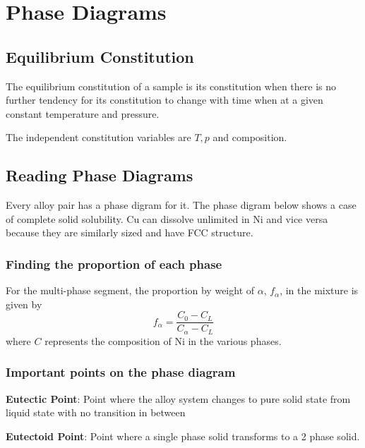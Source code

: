 \section{Phase Diagrams} %
\label{sec:phase_diagrams}

\subsection{Equilibrium Constitution} %
\label{sub:equilibrium_constitution}
The equilibrium constitution of a sample is its constitution when there is no further tendency for its constitution to change with time when at a given constant temperature and pressure. 

The independent constitution variables are $T, p$ and composition.

\subsection{Reading Phase Diagrams} %
\label{sub:reading_phase_diagrams}

Every alloy pair has a phase digram for it. The phase digram below shows a case of complete solid solubility. Cu can dissolve unlimited in Ni and vice versa because they are similarly sized and have FCC structure.


\subsubsection{Finding the proportion of each phase}
For the multi-phase segment, the proportion by weight of $\alpha$, $f_\alpha$, in the mixture is given by
\begin{equation}
  f_\alpha = \frac{C_0-C_L}{C_\alpha-C_L}
\end{equation}
where $C$ represents the composition of Ni in the various phases.

\subsubsection{Important points on the phase diagram}
\textbf{Eutectic Point}: Point where the alloy system changes to pure solid state from liquid state with no transition in between

\textbf{Eutectoid Point}: Point where a single phase solid transforms to a 2 phase solid.

